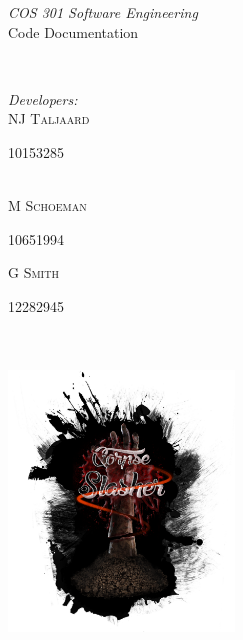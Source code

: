 \documentclass[letterpaper]{article}
\makeatletter
\def\printauthor{%
    {\large \@author}}
\makeatother
\begin{document}
\begin{titlepage}
\begin{center}
\begin{minipage}{0.4\textwidth}
\begin{flushleft} \large
\emph{COS 301 Software Engineering}\\
\vspace{1cm}
Code Documentation
\end{flushleft}
\end{minipage}
~
\begin{minipage}{0.4\textwidth}
	\begin{flushright} \large
	\emph{Developers:} \\
		NJ \textsc{Taljaard} \\
			\begin{small}
				10153285
			\end{small} \\
		M  \textsc{Schoeman} \\
			\begin{small}
				10651994 \\
			\end{small}
		G  \textsc{Smith} \\
			\begin{small}
				12282945
			\end{small}
	\end{flushright}
\end{minipage}\\



\includegraphics[width=60mm, height=80mm]{corpseslasher.png}\\ %
 
\end{center}
\vfill %

\end{titlepage}
\end{document}
